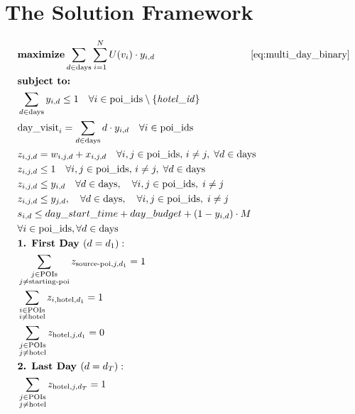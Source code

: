 \section{The \trip Solution Framework}

\begin{align}
    & \textbf{maximize} \sum_{d \in \text{days}} \sum_{i = 1}^{N} U(v_i) \cdot y_{i,d} \hspace{3.4cm} \ref{eq:multi_day_binary} \notag\\
    & \textbf{subject to:} \notag \\ 
    & \sum_{d \in \text{days}} y_{i,d} \leq 1 \quad \forall i \in \text{poi\_ids} \setminus \{\mathit{hotel\_id}\}\\
    & \text{day\_visit}_i = \sum_{d \in \text{days}} d \cdot y_{i,d}\quad \forall i \in \text{poi\_ids} \\
    & z_{i,j,d} = w_{i,j,d} + x_{i,j,d} \quad\forall i, j \in \text{poi\_ids},\, i \ne j,\; \forall d \in \text{days} \\
    & z_{i,j,d} \leq 1 \quad \forall i, j \in \text{poi\_ids},\, i \ne j,\; \forall d \in \text{days} \\
    &  z_{i,j,d} \leq y_{i,d} \quad \forall d \in \text{days},\quad \forall i, j \in \text{poi\_ids},\; i \ne j\  \\
    &  z_{i,j,d} \leq y_{j,d}, \quad \forall d \in \text{days},\quad \forall i, j \in \text{poi\_ids},\; i \ne j\ \\   
    & s_{i,d} \leq day\_start\_time + day\_budget + (1 - y_{i,d}) \cdot M \notag\\
    &\forall i \in \text{poi\_ids}, \forall d \in \text{days}\  \\
    & \textbf{1. First Day } (d = d_1): \notag \\
    & \sum_{\substack{j \in \text{POIs} \\ j \neq \text{starting-poi}}} z_{\text{source-poi},j,d_1} = 1 \\
    & \sum_{\substack{i \in \text{POIs} \\ i \neq \text{hotel}}} z_{i,\text{hotel},d_1} = 1  \\
    & \sum_{\substack{j \in \text{POIs} \\ j \neq \text{hotel}}} z_{\text{hotel},j,d_1} = 0  \\
    & \textbf{2. Last Day } (d = d_T): \notag \\
    & \sum_{\substack{j \in \text{POIs} \\ j \neq \text{hotel}}} z_{\text{hotel},j,d_T} = 1 \\

\end{align}
